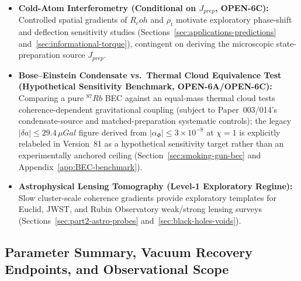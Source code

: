 \documentclass[american,11pt,letterpaper]{article}
\newcommand{\Rcoh}{R_{\mathrm{coh}}}
\def\mathrm#1{#1}%
\def\texttt#1{#1}%
\def\emph#1{#1}%
\def\Rcoh{R_coh}%
\begin{document}
\begin{itemize}
  \item \textbf{Cold-Atom Interferometry (Conditional on $J_{\mathrm{prep}}$, \texttt{OPEN-6C}):} Controlled spatial gradients of $\Rcoh$ and $\rho_t$ motivate exploratory phase-shift and deflection sensitivity studies (Sections~\ref{sec:applications-predictions} and~\ref{sec:informational-torque}), contingent on deriving the microscopic state-preparation source $J_{\mathrm{prep}}$.
  \item \textbf{Bose--Einstein Condensate vs.\ Thermal Cloud Equivalence Test (Hypothetical Sensitivity Benchmark, \texttt{OPEN-6A}/\texttt{OPEN-6C}):} Comparing a pure $^{87}\mathrm{Rb}$ BEC against an equal-mass thermal cloud tests coherence-dependent gravitational coupling (subject to Paper~003/014's condensate-source and matched-preparation systematic controls); the legacy $|\delta a| \le 29.4\,\mu\mathrm{Gal}$ figure derived from $|\alpha_\Phi| \le 3\times 10^{-8}$ at $\chi = 1$ is explicitly relabeled in Version~81 as a \emph{hypothetical sensitivity target} rather than an experimentally anchored ceiling (Section~\ref{sec:smoking-gun-bec} and Appendix~\ref{app:BEC-benchmark}).
  \item \textbf{Astrophysical Lensing Tomography (Level-1 Exploratory Regime):} Slow cluster-scale coherence gradients provide exploratory templates for Euclid, JWST, and Rubin Observatory weak/strong lensing surveys (Sections~\ref{sec:part2-astro-probes} and~\ref{sec:black-holes-voids}).
\end{itemize}

\subsection{Parameter Summary, Vacuum Recovery Endpoints, and Observational Scope}
\end{document}
